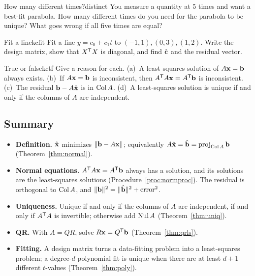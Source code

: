 \documentclass[11pt]{article}
\begin{document}
\begin{think}{How many different times?}{distinct}
You measure a quantity at $5$ times and want a best-fit parabola. How many different times do you need for the parabola to be unique? What goes wrong if all five times are equal?
\end{think}

\begin{kc}{Fit a line}{kcfit}
Fit a line $y=c_0+c_1t$ to $(-1,1),(0,3),(1,2)$. Write the design matrix, show that $X^{\mathsf T} X$ is diagonal, and find $\hat{\mathbf{c}}$ and the residual vector.
\end{kc}

\begin{kc}{True or false}{kctf}
Give a reason for each. (a)~A least-squares solution of $A\mathbf{x}=\mathbf{b}$ always exists. (b)~If $A\mathbf{x}=\mathbf{b}$ is inconsistent, then $A^{\mathsf T} A\mathbf{x}=A^{\mathsf T}\mathbf{b}$ is inconsistent. (c)~The residual $\mathbf{b}-A\hat{\mathbf{x}}$ is in $\operatorname{Col} A$. (d)~A least-squares solution is unique if and only if the columns of $A$ are independent.
\end{kc}

\subsection*{Summary}
\begin{itemize}
  \item \textbf{Definition.} $\hat{\mathbf{x}}$ minimizes $\lVert\mathbf{b}-A\mathbf{x}\rVert$; equivalently $A\hat{\mathbf{x}}=\hat{\mathbf{b}}=\operatorname{proj}_{\operatorname{Col} A}\mathbf{b}$ (Theorem~\ref{thm:normal}).
  \item \textbf{Normal equations.} $A^{\mathsf T} A\mathbf{x}=A^{\mathsf T}\mathbf{b}$ always has a solution, and its solutions are the least-squares solutions (Procedure~\ref{proc:normproc}). The residual is orthogonal to $\operatorname{Col} A$, and $\lVert\mathbf{b}\rVert^2=\lVert\hat{\mathbf{b}}\rVert^2+\text{error}^2$.
  \item \textbf{Uniqueness.} Unique if and only if the columns of $A$ are independent, if and only if $A^{\mathsf T} A$ is invertible; otherwise add $\operatorname{Nul} A$ (Theorem~\ref{thm:uniq}).
  \item \textbf{QR.} With $A=QR$, solve $R\mathbf{x}=Q^{\mathsf T}\mathbf{b}$ (Theorem~\ref{thm:qrls}).
  \item \textbf{Fitting.} A design matrix turns a data-fitting problem into a least-squares problem; a degree-$d$ polynomial fit is unique when there are at least $d+1$ different $t$-values (Theorem~\ref{thm:poly}).
\end{itemize}
\end{document}
